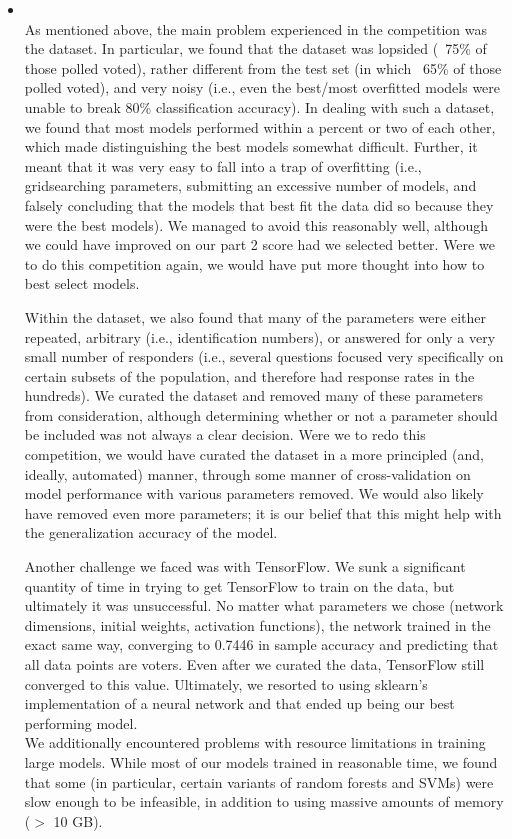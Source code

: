 \begin{itemize}
    \item {} \\
    As mentioned above, the main problem experienced in the competition was the dataset. In particular, we found that the dataset was lopsided (~75\% of those polled voted), rather different from the test set (in which ~65\% of those polled voted), and very noisy (i.e., even the best/most overfitted models were unable to break 80\% classification accuracy). In dealing with such a dataset, we found that most models performed within a percent or two of each other, which made distinguishing the best models somewhat difficult. Further, it meant that it was very easy to fall into a trap of overfitting (i.e., gridsearching parameters, submitting an excessive number of models, and falsely concluding that the models that best fit the data did so because they were the best models). We managed to avoid this reasonably well, although we could have improved on our part 2 score had we selected better. Were we to do this competition again, we would have put more thought into how to best select models.

    Within the dataset, we also found that many of the parameters were either repeated, arbitrary (i.e., identification numbers), or answered for only a very small number of responders (i.e., several questions focused very specifically on certain subsets of the population, and therefore had response rates in the hundreds). We curated the dataset and removed many of these parameters from consideration, although determining whether or not a parameter should be included was not always a clear decision. Were we to redo this competition, we would have curated the dataset in a more principled (and, ideally, automated) manner, through some manner of cross-validation on model performance with various parameters removed. We would also likely have removed even more parameters; it is our belief that this might help with the generalization accuracy of the model.

    Another challenge we faced was with TensorFlow. We sunk a significant quantity of time in trying to get TensorFlow to train on the data, but ultimately it was unsuccessful. No matter what parameters we chose (network dimensions, initial weights, activation functions), the network trained in the exact same way, converging to 0.7446 in sample accuracy and predicting that all data points are voters. Even after we curated the data, TensorFlow still converged to this value. Ultimately, we resorted to using sklearn's implementation of a neural network and that ended up being our best performing model. \\

    We additionally encountered problems with resource limitations in training large models. While most of our models trained in reasonable time, we found that some (in particular, certain variants of random forests and SVMs) were slow enough to be infeasible, in addition to using massive amounts of memory ($> $ 10 GB). \\

\end{itemize}


